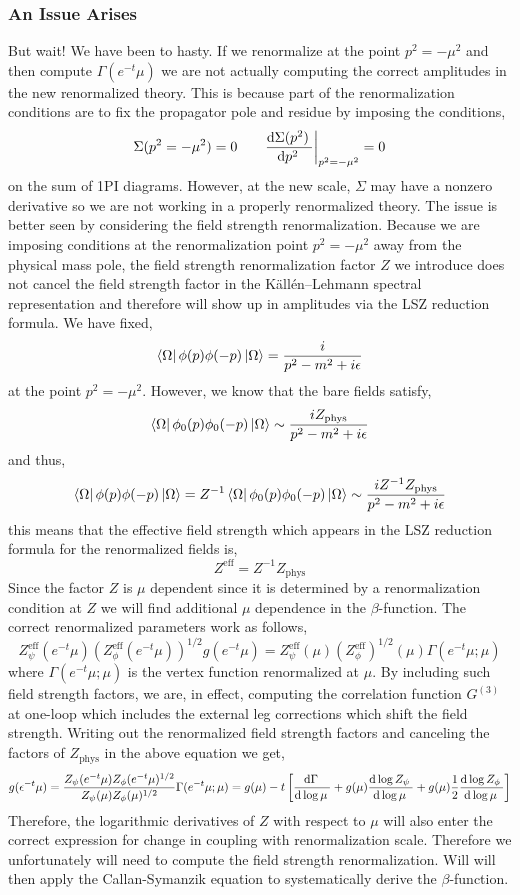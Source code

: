 \documentclass[12pt]{article}
\begin{document}
\subsubsection{An Issue Arises}

But wait! We have been to hasty. If we renormalize at the point $p^2 = - \mu^2$ and then compute $\Gamma(e^{-t} \mu)$ we are not actually computing the correct amplitudes in the new renormalized theory. This is because part of the renormalization conditions are to fix the propagator pole and residue by imposing the conditions,
\[ \Sigma(p^2 = - \mu^2) = 0 \quad \quad \frac{\mathrm{d}\Sigma(p^2) \:}{\mathrm{d}p^2 \:} \bigg|_{p^2 = - \mu^2} = 0 \]
on the sum of 1PI diagrams. However, at the new scale, $\Sigma$ may have a nonzero derivative so we are not working in a properly renormalized theory. The issue is better seen by considering the field strength renormalization. Because we are imposing conditions at the renormalization point $p^2 = - \mu^2$ away from the physical mass pole, the field strength renormalization factor $Z$ we introduce does not cancel the field strength factor in the K\"{a}llén–Lehmann spectral representation and therefore will show up in amplitudes via the LSZ reduction formula. We have fixed,
\[ \left< \Omega \right| \phi(p) \phi(-p) \left| \Omega \right> = \frac{i}{p^2 - m^2 + i \epsilon} \]
at the point $p^2 = - \mu^2$. However, we know that the bare fields satisfy,
\[ \left< \Omega \right| \phi_0(p) \phi_0(-p) \left| \Omega \right> \sim \frac{i Z_{\text{phys}}}{p^2 - m^2 + i \epsilon} \] 
and thus,
\[ \left< \Omega \right| \phi(p) \phi(-p) \left| \Omega \right> = Z^{-1}  \left< \Omega \right| \phi_0(p) \phi_0(-p) \left| \Omega \right> \sim \frac{i Z^{-1} Z_{\text{phys}}}{p^2 - m^2 + i \epsilon} \]
this means that the effective field strength which appears in the LSZ reduction formula for the renormalized fields is,
\[ Z^{\text{eff}} = Z^{-1} Z_{\text{phys}} \]  
Since the factor $Z$ is $\mu$ dependent since it is determined by a renormalization condition at $Z$ we will find additional $\mu$ dependence in the $\beta$-function. The correct renormalized parameters work as follows,
\[ Z^{\text{eff}}_{\psi}(e^{-t} \mu) (Z^{\text{eff}}_{\phi}(e^{-t} \mu))^{1/2} g(e^{-t} \mu) = Z^{\text{eff}}_{\psi}(\mu) (Z^{\text{eff}}_{\phi})^{1/2}(\mu) \Gamma(e^{-t} \mu ; \mu) \]
where $\Gamma(e^{-t} \mu ; \mu)$ is the vertex function renormalized at $\mu$. By including such field strength factors, we are, in effect, computing the correlation function $G^{(3)}$ at one-loop which includes the external leg corrections which shift the field strength. Writing out the renormalized field strength factors and canceling the factors of $Z_{\text{phys}}$ in the above equation we get,
\[ g(\epsilon^{-t} \mu) = \frac{Z_{\psi}(e^{-t} \mu)Z_{\phi}(e^{-t} \mu)^{1/2}}{Z_{\psi}( \mu)Z_{\phi}(\mu)^{1/2}} \Gamma(e^{-t} \mu ; \mu) = g(\mu) - t \left[ \frac{\mathrm{d}\Gamma \:}{\mathrm{d}\log{\mu} \:} + g(\mu) \frac{\mathrm{d}\log{Z_{\psi}} \:}{\mathrm{d}\log{\mu} \:} + g(\mu) \frac{1}{2} \frac{\mathrm{d}\log{Z_{\phi}} \:}{\mathrm{d}\log{\mu} \:} \right] \]
Therefore, the logarithmic derivatives of $Z$ with respect to $\mu$ will also enter the correct expression for change in coupling with renormalization scale. Therefore we unfortunately will need to compute the field strength renormalization. Will will then apply the Callan-Symanzik equation to systematically derive the $\beta$-function. 
\end{document}
